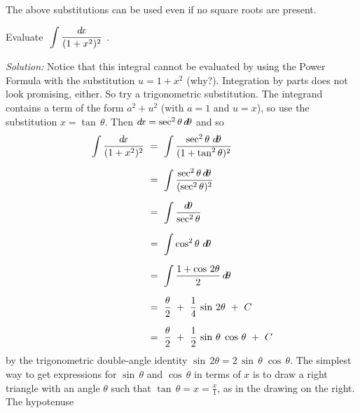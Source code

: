 The above substitutions can be used even if no square roots are present.
\newpage
\begin{exmp}\label{exmp:trigsub2}
\noindent Evaluate $~\displaystyle\int \frac{d\!x}{(1 + x^2)^2}~$.\vspace{1mm}
\par\noindent\emph{Solution:} Notice that this integral cannot be evaluated by
using the Power Formula with the substitution $u=1+x^2$ (why?). Integration by
parts does not look promising, either. So try a trigonometric substitution. The
integrand contains a term of the form $a^2 + u^2$ (with $a=1$ and $u=x$), so use
the substitution $x=\tan\,\theta$. Then $d\!x = \sec^2 \theta\,d\!\theta$ and so
\begin{align*}
\int \frac{d\!x}{(1 + x^2)^2} ~&=~ \int \frac{\sec^2 \theta~d\!\theta}{(1 + \tan^2 \theta)^2}\\[6pt]
&=~ \int \frac{\sec^2 \theta\,d\!\theta}{(\sec^2 \theta)^2}\\[6pt]
&=~ \int \frac{d\!\theta}{\sec^2 \theta}\\[6pt]
&=~ \int \cos^2 \theta~d\!\theta\\[6pt]
&=~ \int \frac{1 + \cos\,2\theta}{2}\,d\!\theta\\[6pt]
&=~ \frac{\theta}{2} ~+~ \frac{1}{4}\,\sin\,2\theta ~+~ C\\[6pt]
&=~ \frac{\theta}{2} ~+~ \frac{1}{2}\,\sin\,\theta\;\cos\,\theta ~+~ C
\end{align*}
by the trigonometric double-angle identity
$\sin\,2\theta = 2\,\sin\,\theta\;\cos\,\theta$.
The simplest way to get expressions for $\sin\,\theta$ and $\cos\,\theta$ in
terms of $x$ is to draw a right triangle with an angle $\theta$ such that
$\tan\,\theta = x = \frac{x}{1}$, as in the drawing on the right. The hypotenuse

\end{exmp}
